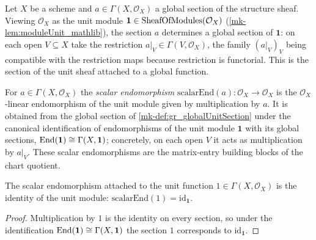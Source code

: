 \begin{definition}\label{mk-def:gr_globalUnitSection}
  \leanok

  Let \(X\) be a scheme and \(a \in \Gamma(X, \mathcal{O}_X)\) a global section of
  the structure sheaf. Viewing \(\mathcal{O}_X\) as the unit module
  \(\mathbf{1} \in \mathrm{SheafOfModules}(\mathcal{O}_X)\) (\ref{mk-lem:moduleUnit_mathlib}), the
  section \(a\) determines a global section of \(\mathbf{1}\): on each open
  \(V \subseteq X\) take the restriction \(a|_V \in \Gamma(V, \mathcal{O}_X)\), the
  family \((a|_V)_V\) being compatible with the restriction maps because
  restriction is functorial. This is the section of the unit sheaf attached to a
  global function.
\end{definition}

\begin{definition}\label{mk-def:gr_scalarEnd}
  \leanok

  For \(a \in \Gamma(X, \mathcal{O}_X)\) the \emph{scalar endomorphism}
  \(\mathrm{scalarEnd}(a) : \mathcal{O}_X \to \mathcal{O}_X\) is the
  \(\mathcal{O}_X\)-linear endomorphism of the unit module given by multiplication
  by \(a\). It is obtained from the global section of \ref{mk-def:gr_globalUnitSection}
  under the canonical identification of endomorphisms of the unit module
  \(\mathbf{1}\) with its global sections, \(\operatorname{End}(\mathbf{1}) \cong
  \Gamma(X, \mathbf{1})\); concretely, on each open \(V\) it acts as
  multiplication by \(a|_V\). These scalar endomorphisms are the matrix-entry
  building blocks of the chart quotient.
\end{definition}

\begin{lemma}\label{mk-lem:gr_scalarEnd_one}
  \leanok

  The scalar endomorphism attached to the unit function \(1 \in
  \Gamma(X, \mathcal{O}_X)\) is the identity of the unit module:
  \(\mathrm{scalarEnd}(1) = \mathrm{id}_{\mathbf{1}}\).
\end{lemma}

\begin{proof}
  Multiplication by \(1\) is the identity on every section, so under the
  identification \(\operatorname{End}(\mathbf{1}) \cong \Gamma(X, \mathbf{1})\) the section \(1\)
  corresponds to \(\mathrm{id}_{\mathbf{1}}\).
\end{proof}

